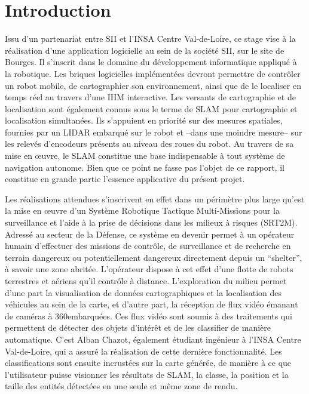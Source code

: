 \chapter*{Introduction}


Issu d’un partenariat entre \gls{SII} et l’INSA Centre Val-de-Loire, ce stage vise à la réalisation d’une application logicielle au sein de la société SII, sur le site de Bourges. 
Il s’inscrit dans le domaine du développement informatique appliqué à la robotique. 
Les briques logicielles implémentées devront permettre de contrôler un robot mobile, de cartographier son environnement, ainsi que de le localiser en temps réel au travers d'une \gls{IHM} interactive. 
Les versants de cartographie et de localisation sont également connus sous le terme de \gls{SLAM} pour cartographie et localisation simultanées. 
Ils s’appuient en priorité sur des mesures spatiales, fournies par un \gls{LIDAR} embarqué sur le robot et --dans une moindre mesure-- sur les relevés d'encodeurs présents au niveau des roues du robot.
Au travers de sa mise en \oe{}uvre, le \gls{SLAM} constitue une base indispensable à tout système de navigation autonome. 
Bien que ce point ne fasse pas l'objet de ce rapport, il constitue en grande partie l'essence applicative du présent projet. 

Les réalisations attendues s'inscrivent en effet dans un périmètre plus large qu’est la mise en \oe{}uvre d’un Système Robotique Tactique Multi-Missions pour la surveillance et l’aide à la prise de décisions dans les milieux à risques (\gls{SRT2M}).
Adressé au secteur de la Défense, ce système en devenir permet à un opérateur humain d’effectuer des missions de contrôle, de surveillance et de recherche en terrain dangereux ou potentiellement dangereux directement depuis un ``shelter'', à savoir une zone abritée. 
L’opérateur dispose à cet effet d’une flotte de robots terrestres et aériens qu’il contrôle à distance. 
L'exploration du milieu permet d'une part la visualisation de données cartographiques et la localisation des véhicules au sein de la carte, et d’autre part, la réception
de flux vidéo émanant de caméras à 360\degre embarquées. 
Ces flux vidéo sont soumis à des traitements qui permettent de détecter des objets d’intérêt et de les classifier de manière automatique. 
C'est Alban Chazot, également étudiant ingénieur à l'INSA Centre Val-de-Loire, qui a assuré la réalisation de cette dernière fonctionnalité.   
Les classifications sont ensuite incrustées sur la carte générée, de manière à ce que l'utilisateur puisse visionner les résultats de \gls{SLAM}, la \gls{classe}, la position et la taille des entités détectées en une seule et même zone de rendu. 

